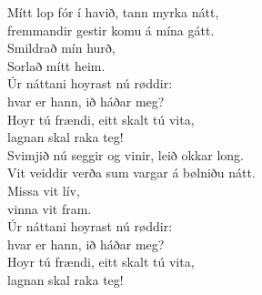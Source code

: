 \nxt
{}
\begin{flushleft}
Mítt lop fór í havið, tann myrka nátt,\\
fremmandir gestir komu á mína gátt.\\
Smildrað mín hurð,\\
Sorlað mítt heim.
\hops
\hspace{0.9cm}\\
\hspace{0.9cm}Úr náttani hoyrast nú røddir:\\
\hspace{0.9cm}hvar er hann, ið háðar meg?\\
\hspace{0.9cm}Hoyr tú frændi, eitt skalt tú vita,\\
\hspace{0.9cm}lagnan skal raka teg!\\
\hops
Svimjið nú seggir og vinir, leið okkar long.\\
Vit veiddir verða sum vargar á bølniðu nátt.\\
Missa vit lív,\\
vinna vit fram.
\hops
\hspace{0.9cm}\\
\hspace{0.9cm}Úr náttani hoyrast nú røddir:\\
\hspace{0.9cm}hvar er hann, ið háðar meg?\\
\hspace{0.9cm}Hoyr tú frændi, eitt skalt tú vita,\\
\hspace{0.9cm}lagnan skal raka teg!\\
\end{flushleft}
\newpage

